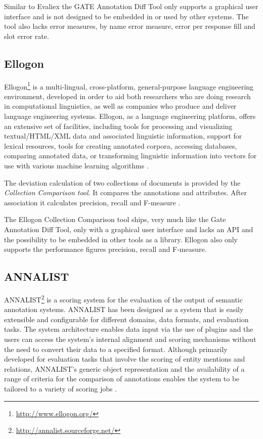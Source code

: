 Similar to Evaliex the GATE Annotation Diff Tool only supports a graphical user interface and is not designed to be embedded in or used by other systems. The tool also lacks error measures, by name error measure, error per response fill and slot error rate.

\subsection{Ellogon}
Ellogon\footnote{\url{http://www.ellogon.org/}} is a multi-lingual, cross-platform, general-purpose language engineering environment, developed in order to aid both researchers who are doing research in computational linguistics, as well as companies who produce and deliver language engineering systems. Ellogon, as a language engineering platform, offers an extensive set of facilities, including tools for processing and visualizing textual/HTML/XML data and associated linguistic information, support for lexical resources, tools for creating annotated corpora, accessing databases, comparing annotated data, or transforming linguistic information into vectors for use with various machine learning algorithms \cite{Ellogon}.

The deviation calculation of two collections of documents is provided by the \textit{Collection Comparison tool}. It compares the annotations and attributes. After association it calculates precision, recall and F-measure \cite{Linsmayr:2010}.

The Ellogon Collection Comparison tool ships, very much like the Gate Annotation Diff Tool, only with a graphical user interface and lacks an API and the possibility to be embedded in other tools as a library. Ellogon also only supports the performance figures precision, recall and F-measure.

\subsection{ANNALIST}
\gls{ANNALIST}\footnote{\url{http://annalist.sourceforge.net/}} is a scoring system for the evaluation of the output of semantic annotation systems. ANNALIST has been designed as a system that is easily extensible and configurable for different domains, data formats, and evaluation tasks. The system architecture enables data input via the use of plugins and the users can access the system’s internal alignment and scoring mechanisms without the need to convert their data to a specified format. Although primarily developed for evaluation tasks that involve the scoring of entity mentions and relations, ANNALIST's generic object representation and the availability of a range of criteria for the comparison of annotations enables the system to be tailored to a variety of scoring jobs \cite{Demetriou:2008}.

